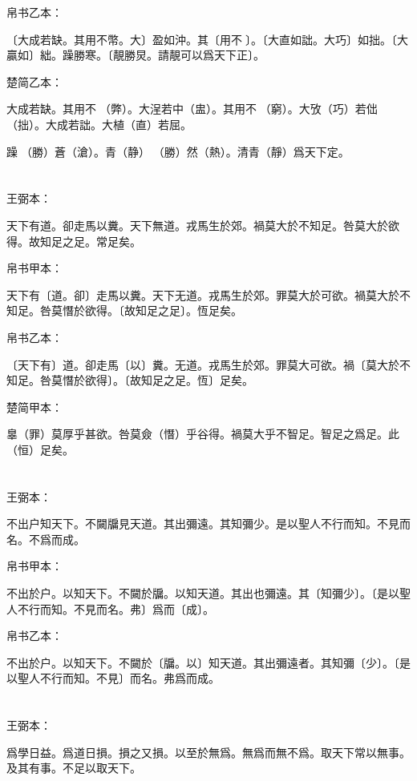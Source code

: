 \documentclass[a5paper]{ctexbook}
\begin{document}
    帛书乙本：

    〔大成若缺。其用不幣。大〕盈如沖。其〔用不𡩫〕。〔大直如詘。大巧〕如拙。〔大贏如〕絀。躁勝寒。〔靚勝炅。請靚可以爲天下正〕。

    楚简乙本：

    大成若缺。其用不󶵢（弊）。大浧若中（盅）。其用不󶵣（窮）。大攷（巧）若㑁（拙）。大成若詘。大植（直）若屈。

    躁󼡲（勝）蒼（滄）。青（静）󼡲（勝）然（熱）。清青（靜）爲天下定。

    \chapter{}
    王弼本：

    天下有道。卻走馬以糞。天下無道。戎馬生於郊。禍莫大於不知足。咎莫大於欲得。故知足之足。常足矣。

    
    帛书甲本：

    天下有〔道。卻〕走馬以糞。天下无道。戎馬生於郊。罪莫大於可欲。禍莫大於不知足。咎莫憯於欲得。〔故知足之足〕。恆足矣。

    帛书乙本：

    〔天下有〕道。卻走馬〔以〕糞。无道。戎馬生於郊。罪莫大可欲。禍〔莫大於不知足。咎莫憯於欲得〕。〔故知足之足。恆〕足矣。

    楚简甲本：

    辠（罪）莫厚乎甚欲。咎莫僉（憯）乎谷得。禍莫大乎不智足。智足之爲足。此𠄨（恒）足矣。

    \chapter{}
    王弼本：

    不出户知天下。不闚牖見天道。其出彌遠。其知彌少。是以聖人不行而知。不見而名。不爲而成。

    
    帛书甲本：

    不出於户。以知天下。不闚於牖。以知天道。其出也彌遠。其〔知彌少〕。〔是以聖人不行而知。不見而名。弗〕爲而〔成〕。

    帛书乙本：

    不出於户。以知天下。不闚於〔牖。以〕知天道。其出彌遠者。其知彌〔少〕。〔是以聖人不行而知。不見〕而名。弗爲而成。

    \chapter{}
    王弼本：

    爲學日益。爲道日損。損之又損。以至於無爲。無爲而無不爲。取天下常以無事。及其有事。不足以取天下。
\end{document}

